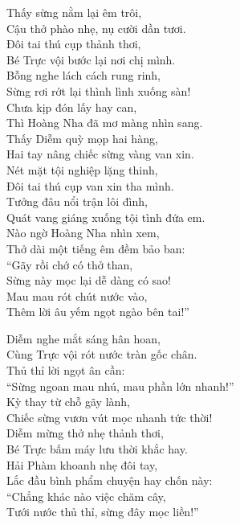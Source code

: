 \documentclass[../main.tex]{subfiles}
\begin{document}
\begin{center}
    Thấy sừng nằm lại êm trôi,\\
    Cậu thở phào nhẹ, nụ cười dần tươi.\\
    Đôi tai thú cụp thảnh thơi,\\
    Bé Trực vội bước lại nơi chị mình.\\
    Bỗng nghe lách cách rung rinh,\\
    Sừng rơi rớt lại thình lình xuống sàn!\\
    Chưa kịp đón lấy hay can,\\
    Thì Hoàng Nha đã mơ màng nhìn sang.\\
    Thấy Diễm quỳ mọp hai hàng,\\
    Hai tay nâng chiếc sừng vàng van xin.\\
    Nét mặt tội nghiệp lặng thinh,\\
    Đôi tai thú cụp van xin tha mình.\\
    Tưởng đâu nổi trận lôi đình,\\
    Quát vang giáng xuống tội tình đứa em.\\
    Nào ngờ Hoàng Nha nhìn xem,\\
    Thở dài một tiếng êm đềm bảo ban:\\
    ``Gãy rồi chớ có thở than,\\
    Sừng này mọc lại dễ dàng có sao!\\
    Mau mau rót chút nước vào,\\
    Thêm lời âu yếm ngọt ngào bên tai!''


    Diễm nghe mắt sáng hân hoan,\\
    Cùng Trực vội rót nước tràn gốc chân.\\
    Thủ thỉ lời ngọt ân cần:\\
    ``Sừng ngoan mau nhú, mau phần lớn nhanh!''\\
    Kỳ thay từ chỗ gãy lành,\\
    Chiếc sừng vươn vút mọc nhanh tức thời!\\
    Diễm mừng thở nhẹ thảnh thơi,\\
    Bé Trực bấm máy lưu thời khắc hay.\\
    Hải Phàm khoanh nhẹ đôi tay,\\
    Lắc đầu bình phẩm chuyện hay chốn này:\\
    ``Chẳng khác nào việc chăm cây,\\
    Tưới nước thủ thỉ, sừng đây mọc liền!''
\end{center}
\end{document}
